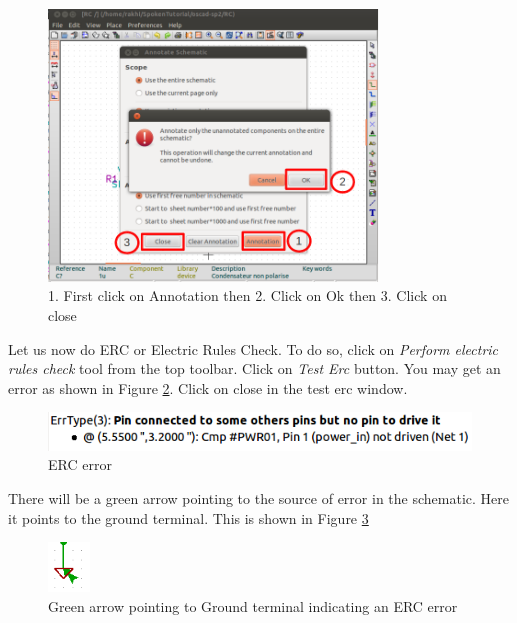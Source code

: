 \begin{figure}
\centering
\includegraphics[width=0.78\textwidth]{figures/anno}
\caption{1. First click on Annotation then 2. Click on Ok then 3. Click on close}
\label{anno}
\end{figure}
Let us now do ERC or Electric Rules Check. To do so, click on \textit{Perform electric rules check} tool from the top toolbar. Click on \textit{Test Erc} button. You may get an error as shown in Figure \ref{erc}. Click on close in the test erc window.
\begin{figure}
\centering
\includegraphics[width=\textwidth]{figures/erc1}
\caption{ERC error}
\label{erc}
\end{figure}
There will be a green arrow pointing to the source of error in the schematic. Here it points to the ground terminal. This is shown in Figure \ref{ercgnd}
\begin{figure}
\centering
\includegraphics[width=0.1\textwidth]{figures/ercgnd}
\caption{Green arrow pointing to Ground terminal indicating an ERC error}
\label{ercgnd}
\end{figure}

